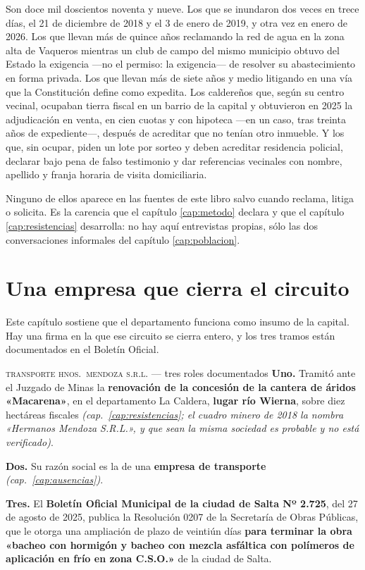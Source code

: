Son doce mil doscientos noventa y nueve. Los que se inundaron dos veces en trece días, el 21 de diciembre de 2018 y el 3 de enero de 2019, y otra vez en enero de 2026. Los que llevan más de quince años reclamando la
red de agua en la zona alta de Vaqueros mientras un club de campo del mismo municipio obtuvo
del Estado la exigencia —no el permiso: la exigencia— de resolver su abastecimiento en forma
privada. Los que llevan más de siete años y medio litigando en una vía que la Constitución define
como expedita. Los caldereños que, según su centro vecinal, ocupaban tierra fiscal en un barrio de la capital y obtuvieron en 2025 la adjudicación en venta, en cien cuotas y con hipoteca ---en un caso, tras treinta años de expediente---, después de acreditar que no tenían otro inmueble. Y los que, sin ocupar, piden un lote por sorteo y deben acreditar residencia policial,
declarar bajo pena de falso testimonio y dar referencias vecinales con nombre, apellido y
franja horaria de visita domiciliaria.

Ninguno de ellos aparece en las fuentes de este libro salvo cuando reclama, litiga o
solicita. Es la carencia que el capítulo \ref{cap:metodo} declara y que el capítulo \ref{cap:resistencias} desarrolla: no hay
aquí entrevistas propias, sólo las dos conversaciones informales del capítulo \ref{cap:poblacion}.

\section{Una empresa que cierra el circuito}

Este capítulo sostiene que el departamento funciona como insumo de la capital. Hay una firma en
la que ese circuito se cierra entero, y los tres tramos están documentados en el Boletín
Oficial.

\begin{ficha}{\textsc{transporte hnos.\ mendoza s.r.l.} --- tres roles documentados}
\textbf{Uno.} Tramitó ante el Juzgado de Minas la \textbf{renovación de la concesión de la
cantera de áridos «Macarena»}, en el departamento La Caldera, \textbf{lugar río Wierna}, sobre
diez hectáreas fiscales \textit{(cap.\ \ref{cap:resistencias}; el cuadro minero de 2018 la nombra «Hermanos Mendoza S.R.L.», y que sean la misma sociedad es probable y no está verificado)}.

\textbf{Dos.} Su razón social es la de una \textbf{empresa de transporte}
\textit{(cap.\ \ref{cap:ausencias})}.

\textbf{Tres.} El \textbf{Boletín Oficial Municipal de la ciudad de Salta Nº 2.725}, del 27 de
agosto de 2025, publica la Resolución 0207 de la Secretaría de Obras Públicas, que le otorga
una ampliación de plazo de veintiún días \textbf{para terminar la obra «bacheo con hormigón y
bacheo con mezcla asfáltica con polímeros de aplicación en frío en zona C.S.O.»} de la ciudad
de Salta.
\end{ficha}

